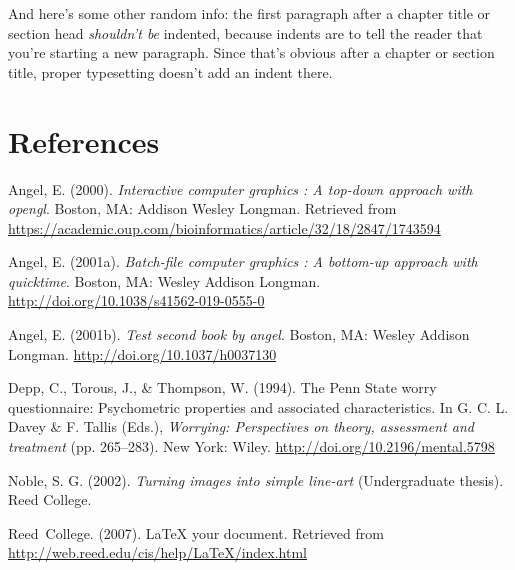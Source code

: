 \documentclass[12pt,twoside]{reedthesis}
\begin{document}
And here's some other random info: the first paragraph after a chapter title or section head \emph{shouldn't be} indented, because indents are to tell the reader that you're starting a new paragraph. Since that's obvious after a chapter or section title, proper typesetting doesn't add an indent there.

\backmatter

\hypertarget{references}{%
\chapter*{References}\label{references}}


\noindent

\setlength{\parindent}{-0.20in}
\setlength{\leftskip}{0.20in}
\setlength{\parskip}{8pt}

\hypertarget{refs}{}
\leavevmode\hypertarget{ref-angel2000}{}%
Angel, E. (2000). \emph{Interactive computer graphics : A top-down approach with opengl}. Boston, MA: Addison Wesley Longman. Retrieved from \url{https://academic.oup.com/bioinformatics/article/32/18/2847/1743594}

\leavevmode\hypertarget{ref-angel2001}{}%
Angel, E. (2001a). \emph{Batch-file computer graphics : A bottom-up approach with quicktime}. Boston, MA: Wesley Addison Longman. \url{http://doi.org/10.1038/s41562-019-0555-0}

\leavevmode\hypertarget{ref-angel2002a}{}%
Angel, E. (2001b). \emph{Test second book by angel}. Boston, MA: Wesley Addison Longman. \url{http://doi.org/10.1037/h0037130}

\leavevmode\hypertarget{ref-Molina1994}{}%
Depp, C., Torous, J., \& Thompson, W. (1994). The Penn State worry questionnaire: Psychometric properties and associated characteristics. In G. C. L. Davey \& F. Tallis (Eds.), \emph{Worrying: Perspectives on theory, assessment and treatment} (pp. 265--283). New York: Wiley. \url{http://doi.org/10.2196/mental.5798}

\leavevmode\hypertarget{ref-noble2002}{}%
Noble, S. G. (2002). \emph{Turning images into simple line-art} (Undergraduate thesis). Reed College.

\leavevmode\hypertarget{ref-reedweb2007}{}%
Reed~College. (2007). LaTeX your document. Retrieved from \url{http://web.reed.edu/cis/help/LaTeX/index.html}


\end{document}
